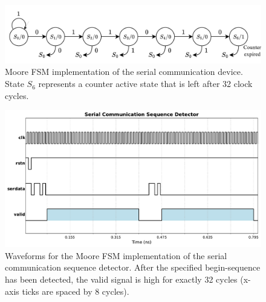 \documentclass[../main.tex]{subfiles}
\begin{document}
\begin{figure}[h]
    \centering
    \includegraphics[width=\textwidth]{assets/q3_fsm.png}
    \caption{Moore FSM implementation of the serial communication device. State $S_6$ represents a counter active state that is left after 32 clock cycles.}
    \label{fig:q3_fsm}
\end{figure}

\newpage

\begin{figure}[h]
    \centering
    \includegraphics[width=\textwidth]{assets/q3_wave.pdf}
    \vspace{-10pt}
    \caption{Waveforms for the Moore FSM implementation of the serial communication sequence detector. After the specified begin-sequence has been detected, the valid signal is high for exactly 32 cycles (x-axis ticks are spaced by 8 cycles).}
    \label{fig:q3_wave}
\end{figure}
\end{document}
